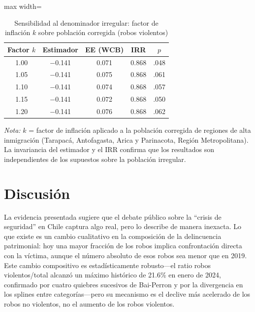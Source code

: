 \documentclass[12pt,a4paper]{article}
\newcommand{\tablenote}[1]{%
  \vspace{2pt}%
  \begin{minipage}{\linewidth}%
    \footnotesize\textit{Nota:} #1%
  \end{minipage}%
}
\begin{document}
\begin{table}[H]
\centering
\caption{Sensibilidad al denominador irregular: factor de inflaci\'on $k$ sobre
poblaci\'on corregida (robos violentos)}
\label{tab:sensipop}
\small
\begin{adjustbox}{max width=\columnwidth}
\begin{tabular}{ccccc}
\toprule
\textbf{Factor $k$} & \textbf{Estimador} & \textbf{EE (WCB)} & \textbf{IRR} & $p$ \\
\midrule
1.00 & $-$0.141 & 0.071 & 0.868 & .048 \\
1.05 & $-$0.141 & 0.075 & 0.868 & .061 \\
1.10 & $-$0.141 & 0.074 & 0.868 & .057 \\
1.15 & $-$0.141 & 0.072 & 0.868 & .050 \\
1.20 & $-$0.141 & 0.076 & 0.868 & .062 \\
\bottomrule
\end{tabular}
\end{adjustbox}
\tablenote{$k$ = factor de inflaci\'on aplicado a la poblaci\'on corregida de regiones
de alta inmigraci\'on (Tarapac\'a, Antofagasta, Arica y Parinacota, Regi\'on
Metropolitana). La invariancia del estimador y el IRR confirma que los resultados son
independientes de los supuestos sobre la poblaci\'on irregular.}
\end{table}


\section{Discusi\'on}
\label{sec:discusion}

La evidencia presentada sugiere que el debate p\'ublico sobre la ``crisis de seguridad''
en Chile captura algo real, pero lo describe de manera inexacta. Lo que existe es un
cambio cualitativo en la composici\'on de la delincuencia patrimonial: hoy una mayor
fracci\'on de los robos implica confrontaci\'on directa con la v\'ictima, aunque el
n\'umero absoluto de esos robos sea menor que en 2019. Este cambio compositivo es
estad\'isticamente robusto---el ratio robos violentos/total alcanz\'o un m\'aximo
hist\'orico de 21.6\% en enero de 2024, confirmado por cuatro quiebres sucesivos de
Bai-Perron y por la divergencia en los splines entre categor\'ias---pero su mecanismo
es el declive m\'as acelerado de los robos no violentos, no el aumento de los robos
violentos.
\end{document}
